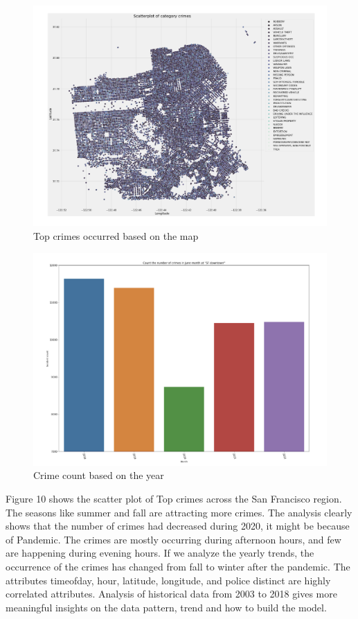 \documentclass[11 pt,conference,final,]{IEEEtran}
\begin{document}
\begin{figure}

{\centering \includegraphics[width=0.7\linewidth]{img/fig10} 

}

\caption{Top crimes occurred based on the map}\label{fig:unnamed-chunk-10}
\end{figure}

\begin{figure}

{\centering \includegraphics[width=0.5\linewidth]{img/fig11} 

}

\caption{Crime count based on the year}\label{fig:unnamed-chunk-11}
\end{figure}

Figure 10 shows the scatter plot of Top crimes across the San Francisco
region. The seasons like summer and fall are attracting more crimes. The
analysis clearly shows that the number of crimes had decreased during
2020, it might be because of Pandemic. The crimes are mostly occurring
during afternoon hours, and few are happening during evening hours. If
we analyze the yearly trends, the occurrence of the crimes has changed
from fall to winter after the pandemic. The attributes timeofday, hour,
latitude, longitude, and police distinct are highly correlated
attributes. Analysis of historical data from 2003 to 2018 gives more
meaningful insights on the data pattern, trend and how to build the
model.
\end{document}
